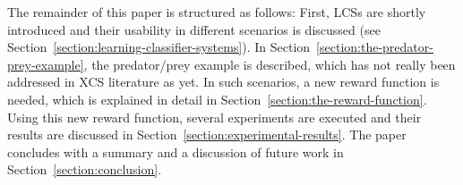 The remainder of this paper is structured as follows: First, LCSs are shortly introduced and their usability in different scenarios is discussed (see Section~\ref{section:learning-classifier-systems}). In Section~\ref{section:the-predator-prey-example}, the predator/prey example is described, which has not really been addressed in XCS literature as yet. %
In such scenarios, a new reward function is needed, which is explained in detail in Section~\ref{section:the-reward-function}. Using this new reward function, several experiments are executed and their results are discussed in Section~\ref{section:experimental-results}. The paper concludes with a summary and a discussion of future work in Section~\ref{section:conclusion}. %
